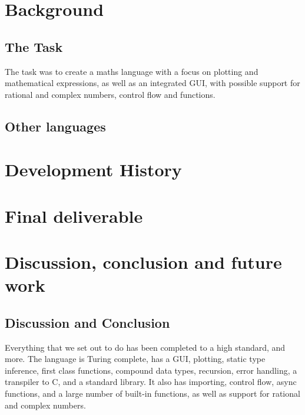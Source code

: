 \documentclass[a4paper, oneside, 11pt]{report}
\begin{document}
\chapter{Background}\label{ch:background}

\section{The Task}\label{sec:the-task}

The task was to create a maths language with a focus on plotting and mathematical expressions, as well as an 
integrated GUI\@, with possible support for rational and complex numbers, control flow and functions.

\section{Other languages}\label{sec:other-languages}

\chapter{Development History}\label{ch:devhist}



\chapter{Final deliverable}\label{ch:impl}



\chapter{Discussion, conclusion and future work}\label{ch:discussion-conclusion-and-future-work}

\section{Discussion and Conclusion}\label{sec:discussion}

Everything that we set out to do has been completed to a high standard, and more.
The language is Turing complete, has a GUI, plotting, static type inference, first class functions, compound data types,
recursion, error handling, a transpiler to C, and a standard library.
It also has importing, control flow, async functions, and a large number of built-in functions, as well as support 
for rational and complex numbers.
\end{document}
